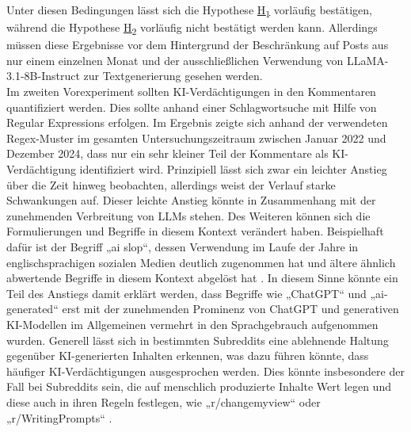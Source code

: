 Unter diesen Bedingungen lässt sich die Hypothese \hyperlink{hp:1}{H\textsubscript{1}} vorläufig bestätigen, während die Hypothese \hyperlink{hp:2}{H\textsubscript{2}} vorläufig nicht bestätigt werden kann. Allerdings müssen diese Ergebnisse vor dem Hintergrund der Beschränkung auf Posts aus nur einem einzelnen Monat und der ausschließlichen Verwendung von LLaMA-3.1-8B-Instruct zur Textgenerierung gesehen werden. \\
Im zweiten Vorexperiment sollten KI-Verdächtigungen in den Kommentaren quantifiziert werden. Dies sollte anhand einer Schlagwortsuche mit Hilfe von Regular Expressions erfolgen. Im Ergebnis zeigte sich anhand der verwendeten Regex-Muster im gesamten Untersuchungszeitraum zwischen Januar 2022 und Dezember 2024, dass nur ein sehr kleiner Teil der Kommentare als KI-Verdächtigung identifiziert wird. Prinzipiell lässt sich zwar ein leichter Anstieg über die Zeit hinweg beobachten, allerdings weist der Verlauf starke Schwankungen auf. Dieser leichte Anstieg könnte in Zusammenhang mit der zunehmenden Verbreitung von LLMs stehen. Des Weiteren können sich die Formulierungen und Begriffe in diesem Kontext verändert haben. Beispielhaft dafür ist der Begriff „ai slop“, dessen Verwendung im Laufe der Jahre in englischsprachigen sozialen Medien deutlich zugenommen hat und ältere ähnlich abwertende Begriffe in diesem Kontext abgelöst hat \autocite{miklian2026s}. In diesem Sinne könnte ein Teil des Anstiegs damit erklärt werden, dass Begriffe wie „ChatGPT“ und „ai-generated“ erst mit der zunehmenden Prominenz von ChatGPT und generativen KI-Modellen im Allgemeinen vermehrt in den Sprachgebrauch aufgenommen wurden. Generell lässt sich in bestimmten Subreddits eine ablehnende Haltung gegenüber KI-generierten Inhalten erkennen, was dazu führen könnte, dass häufiger KI-Verdächtigungen ausgesprochen werden. Dies könnte insbesondere der Fall bei Subreddits sein, die auf menschlich produzierte Inhalte Wert legen und diese auch in ihren Regeln festlegen, wie „r/changemyview“ oder „r/WritingPrompts“ \autocite{lloyd2025there}.
